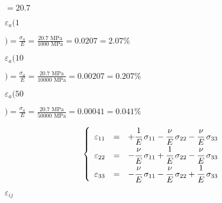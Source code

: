 \documentclass[onecolumn,11pt]{report}
\def\lthtmlcheckvsize{\ifdim\ht\sizebox<\vsize 
  \ifdim\wd\sizebox<\hsize\expandafter\hfill\fi \expandafter\vfill
  \else\expandafter\vss\fi}%
\begin{document}
{\newpage\clearpage
{}%
$\displaystyle = 20.7$%
\lthtmlindisplaymathZ
\lthtmlcheckvsize\clearpage}

{\newpage\clearpage
{}%
$\displaystyle \varepsilon_a(1$%
\lthtmlindisplaymathZ
\lthtmlcheckvsize\clearpage}

{\newpage\clearpage
{}%
$\displaystyle ) = \frac{\sigma_a}{E} = \frac{20.7 \text{ MPa}}{1000 \text{ MPa}} = 0.0207 = 2.07 \%
$%
\lthtmlindisplaymathZ
\lthtmlcheckvsize\clearpage}

{\newpage\clearpage
{}%
$\displaystyle \varepsilon_a(10$%
\lthtmlindisplaymathZ
\lthtmlcheckvsize\clearpage}

{\newpage\clearpage
{}%
$\displaystyle ) = \frac{\sigma_a}{E} = \frac{20.7 \text{ MPa}}{10000 \text{ MPa}} = 0.00207 = 0.207 \%
$%
\lthtmlindisplaymathZ
\lthtmlcheckvsize\clearpage}

{\newpage\clearpage
{}%
$\displaystyle \varepsilon_a(50$%
\lthtmlindisplaymathZ
\lthtmlcheckvsize\clearpage}

{\newpage\clearpage
{}%
$\displaystyle ) = \frac{\sigma_a}{E} = \frac{20.7 \text{ MPa}}{50000 \text{ MPa}} = 0.00041 = 0.041 \%
$%
\lthtmlindisplaymathZ
\lthtmlcheckvsize\clearpage}

{\newpage\clearpage
{}%
\begin{displaymath}\left\lbrace
\begin{array}{rcl}
\varepsilon_{11} & = & +\cfrac{1}{E} \: \sigma_{11} -\cfrac{\nu}{E} \: \sigma_{22} -\cfrac{\nu}{E} \: \sigma_{33}\\
\varepsilon_{22} & = &  -\cfrac{\nu}{E} \: \sigma_{11} +\cfrac{1}{E} \: \sigma_{22} - \cfrac{\nu}{E} \: \sigma_{33}\\
\varepsilon_{33} & = & -\cfrac{\nu}{E} \: \sigma_{11} -\cfrac{\nu}{E} \: \sigma_{22} + \cfrac{1}{E} \: \sigma_{33}
\end{array}
\right.\end{displaymath}%
\lthtmldisplayZ
\lthtmlcheckvsize\clearpage}

{\newpage\clearpage
{}%
$ \varepsilon_{ij}$%
\lthtmlindisplaymathZ
\lthtmlcheckvsize\clearpage}
\end{document}
